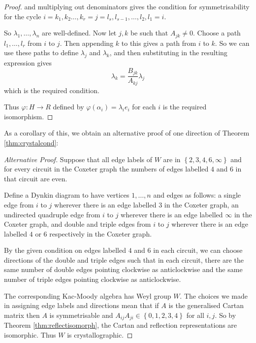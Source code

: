 \documentclass[11pt,a4paper]{report}
\theoremstyle{definition}
\begin{document}
\begin{proof}
and multiplying out denominators gives the condition for symmetrisability for the cycle $i = k_1, k_2 \ldots, k_r = j = l_s, l_{s-1}, \ldots, l_2, l_1 = i$. 

So $\lambda_1, \ldots, \lambda_n$ are well-defined. Now let $j, k$ be such that $A_{jk} \neq 0$. Choose a path $l_1, \ldots, l_r$ from $i$ to $j$. Then appending $k$ to this gives a path from $i$ to $k$. So we can use these paths to define $\lambda_j$ and $\lambda_k$, and then substituting in the resulting expression gives \begin{equation*}\lambda_k = \frac{B_{jk}}{A_{kj}} \lambda_j\end{equation*} which is the required condition.

Thus $\varphi: H \to R$ defined by $\varphi(\alpha_i) = \lambda_i e_i$ for each $i$ is the required isomorphism. \end{proof}

As a corollary of this, we obtain an alternative proof of one direction of Theorem \ref{thm:crystalcond}:

\begin{proof}[Alternative Proof]Suppose that all edge labels of $W$ are in $\left\{2,3,4,6, \infty\right\}$ and for every circuit in the Coxeter graph the numbers of edges labelled $4$ and $6$ in that circuit are even. 

Define a Dynkin diagram to have vertices $1, \ldots, n$ and edges as follows: a single edge from $i$ to $j$ wherever there is an edge labelled $3$ in the Coxeter graph, an undirected quadruple edge from $i$ to $j$ wherever there is an edge labelled $\infty$ in the Coxeter graph, and double and triple edges from $i$ to $j$ wherever there is an edge labelled $4$ or $6$ respectively in the Coxeter graph. 

By the given condition on edges labelled $4$ and $6$ in each circuit, we can choose directions of the double and triple edges such that in each circuit, there are the same number of double edges pointing clockwise as anticlockwise and the same number of triple edges pointing clockwise as anticlockwise. 

The corresponding Kac-Moody algebra has Weyl group $W$. The choices we made in assigning edge labels and directions mean that if $A$ is the generalised Cartan matrix then $A$ is symmetrisable and $A_{ij} A_{ji} \in \left\{0,1,2,3,4\right\}$ for all $i, j$. So by Theorem \ref{thm:reflectisomorph}, the Cartan and reflection representations are isomorphic. Thus $W$ is crystallographic. \end{proof}
\end{document}
